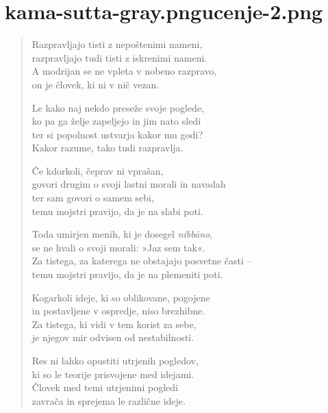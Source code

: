 
\chapter[Duṭṭhaṭṭhaka Sutta]{{kama-sutta-gray.png}{ucenje-2.png}}


\begin{verse}


Razpravljajo tisti z nepoštenimi nameni,\\
razpravljajo tudi tisti z iskrenimi nameni.\\
A modrijan se ne vpleta v nobeno razpravo,\\
on je človek, ki ni v nič vezan.

Le kako naj nekdo preseže svoje poglede,\\
ko pa ga želje zapeljejo in jim nato sledi\\
ter si popolnost ustvarja kakor mu godi?\\
Kakor razume, tako tudi razpravlja.

Če kdorkoli, čeprav ni vprašan,\\
govori drugim o svoji lastni morali in navadah\\
ter sam govori o samem sebi,\\
temu mojstri pravijo, da je na slabi poti.

Toda umirjen menih, ki je dosegel \emph{nibbāno},\\
se ne hvali o svoji morali: »Jaz sem tak«.\\
Za tistega, za katerega ne obstajajo posvetne časti --\\
temu mojstri pravijo, da je na plemeniti poti.

Kogarkoli ideje, ki so oblikovane, pogojene\\
in postavljene v ospredje, niso brezhibne.\\
Za tistega, ki vidi v tem korist za sebe,\\
je njegov mir odvisen od nestabilnosti.

Res ni lahko opustiti utrjenih pogledov,\\
ki so le teorije prisvojene med idejami.\\
Človek med temi utrjenimi pogledi\\
zavrača in sprejema le različne ideje.


\end{verse}

